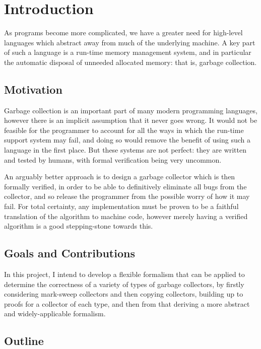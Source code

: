 \chapter{Introduction}

As programs become more complicated, we have a greater need for
high-level languages which abstract away from much of the underlying
machine. A key part of such a language is a run-time \gls{memory
  management} system, and in particular the automatic disposal of
unneeded allocated memory: that is, \gls{garbage collection}.

\section{Motivation}

Garbage collection is an important part of many modern programming
languages, however there is an implicit assumption that it never goes
wrong. It would not be feasible for the programmer to account for all
the ways in which the run-time support system may fail, and doing so
would remove the benefit of using such a language in the first
place. But these systems are not perfect: they are written and tested
by humans, with formal verification being very uncommon.

An arguably better approach is to design a \gls{garbage collector}
which is then formally verified, in order to be able to definitively
eliminate all bugs from the \gls{collector}, and so release the
programmer from the possible worry of how it may fail. For total
certainty, any implementation must be proven to be a faithful
translation of the algorithm to machine code, however merely having a
verified algorithm is a good stepping-stone towards this.

\section{Goals and Contributions}

In this project, I intend to develop a flexible formalism that can be
applied to determine the correctness of a variety of types of
\glspl{garbage collector}, by firstly considering \gls{mark-sweep}
\glspl{collector} and then \gls{copying} \glspl{collector}, building
up to proofs for a \gls{collector} of each type, and then from that
deriving a more abstract and widely-applicable formalism.


\section{Outline}

